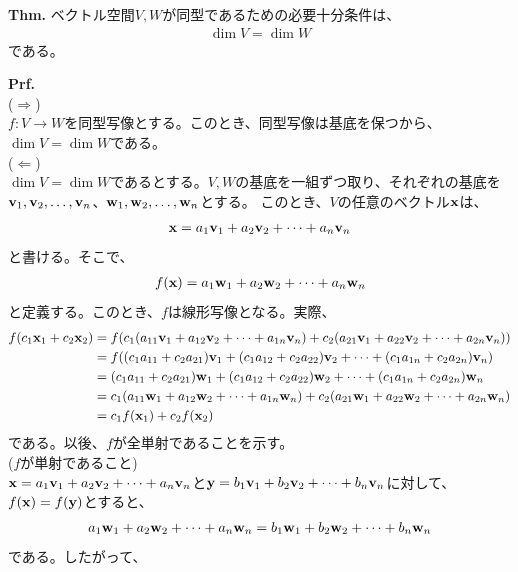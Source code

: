 \documentclass[a4paper,11pt]{jsarticle}
\numberwithin{equation}{section}
\begin{document}
\begin{itembox}[l]{\textbf{Thm.}}
  ベクトル空間$V, W$が同型であるための必要十分条件は、
  \begin{align}
    \dim V = \dim W
  \end{align}
  である。
\end{itembox}
\textbf{Prf.}\\
($\Rightarrow$)\\
$f:V \to W$を同型写像とする。このとき、同型写像は基底を保つから、$\dim V = \dim W$である。\\
($\Leftarrow$)\\
$\dim V = \dim W$であるとする。$V,W$の基底を一組ずつ取り、それぞれの基底を$\vb{v}_1, \vb{v}_2, \dots, \vb{v}_n$、$\vb{w}_1, \vb{w}_2, \dots, \vb{w}_n$とする。
このとき、$V$の任意のベクトル$\vb{x}$は、
\begin{align}
  \vb{x} = a_1\vb{v}_1 + a_2\vb{v}_2 + \dots + a_n\vb{v}_n
\end{align}
と書ける。そこで、
\begin{align}
  f(\vb{x}) = a_1\vb{w}_1 + a_2\vb{w}_2 + \dots + a_n\vb{w}_n
\end{align}
と定義する。このとき、$f$は線形写像となる。実際、
\begin{align}
  f(c_1\vb{x}_1 + c_2\vb{x}_2) &= f(c_1(a_{11}\vb{v}_1 + a_{12}\vb{v}_2 + \dots + a_{1n}\vb{v}_n) + c_2(a_{21}\vb{v}_1 + a_{22}\vb{v}_2 + \dots + a_{2n}\vb{v}_n))\\
  &= f((c_1a_{11} + c_2a_{21})\vb{v}_1 + (c_1a_{12} + c_2a_{22})\vb{v}_2 + \dots + (c_1a_{1n} + c_2a_{2n})\vb{v}_n)\\
  &= (c_1a_{11} + c_2a_{21})\vb{w}_1 + (c_1a_{12} + c_2a_{22})\vb{w}_2 + \dots + (c_1a_{1n} + c_2a_{2n})\vb{w}_n\\
  &= c_1(a_{11}\vb{w}_1 + a_{12}\vb{w}_2 + \dots + a_{1n}\vb{w}_n) + c_2(a_{21}\vb{w}_1 + a_{22}\vb{w}_2 + \dots + a_{2n}\vb{w}_n)\\
  &= c_1f(\vb{x}_1) + c_2f(\vb{x}_2)
\end{align}
である。以後、$f$が全単射であることを示す。\\
($f$が単射であること)\\
$\vb{x}=a_1\vb{v}_1 + a_2\vb{v}_2 + \dots + a_n\vb{v}_n$と$\vb{y}=b_1\vb{v}_1 + b_2\vb{v}_2 + \dots + b_n\vb{v}_n$に対して、$f(\vb{x}) = f(\vb{y})$とすると、
\begin{align}
  a_1\vb{w}_1 + a_2\vb{w}_2 + \dots + a_n\vb{w}_n = b_1\vb{w}_1 + b_2\vb{w}_2 + \dots + b_n\vb{w}_n
\end{align}
である。したがって、
\end{document}
